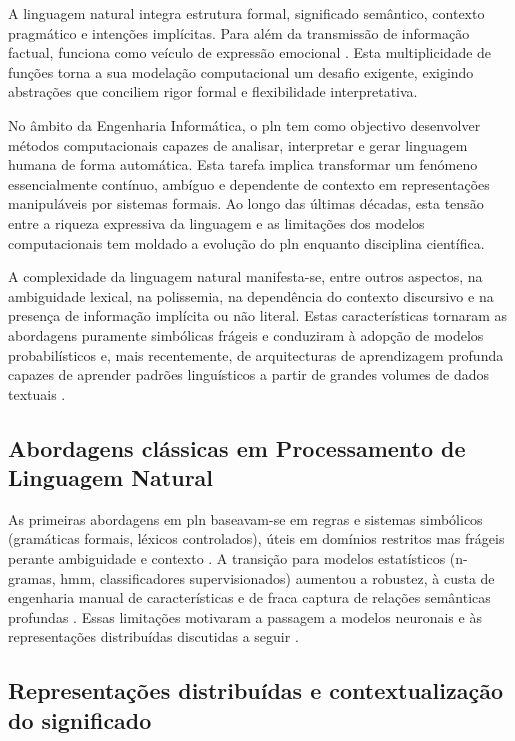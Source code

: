 A linguagem natural integra estrutura formal, significado semântico, contexto pragmático e intenções implícitas. Para além da transmissão de informação factual, funciona como veículo de expressão emocional \parencite{Wiebe2005Opinions, MohammadTurney2013Lexicon}. Esta multiplicidade de funções torna a sua modelação computacional um desafio exigente, exigindo abstrações que conciliem rigor formal e flexibilidade interpretativa.

No âmbito da Engenharia Informática, o \gls{pln} tem como objectivo desenvolver métodos computacionais capazes de analisar, interpretar e gerar linguagem humana de forma automática. Esta tarefa implica transformar um fenómeno essencialmente contínuo, ambíguo e dependente de contexto em representações manipuláveis por sistemas formais. Ao longo das últimas décadas, esta tensão entre a riqueza expressiva da linguagem e as limitações dos modelos computacionais tem moldado a evolução do \gls{pln} enquanto disciplina científica.

A complexidade da linguagem natural manifesta-se, entre outros aspectos, na ambiguidade lexical, na polissemia, na dependência do contexto discursivo e na presença de informação implícita ou não literal. Estas características tornaram as abordagens puramente simbólicas frágeis e conduziram à adopção de modelos probabilísticos e, mais recentemente, de arquitecturas de aprendizagem profunda capazes de aprender padrões linguísticos a partir de grandes volumes de dados textuais \parencite{Manning2011NLP, Young2018Trends}.

\subsection{Abordagens clássicas em Processamento de Linguagem Natural}
\label{subsec:pln_classico}

As primeiras abordagens em \gls{pln} baseavam-se em regras e sistemas simbólicos (gramáticas formais, léxicos controlados), úteis em domínios restritos mas frágeis perante ambiguidade e contexto \parencite{Manning2011NLP}. A transição para modelos estatísticos (n-gramas, \gls{hmm}, classificadores supervisionados) aumentou a robustez, à custa de engenharia manual de características e de fraca captura de relações semânticas profundas \parencite{Manning2011NLP, Young2018Trends}. Essas limitações motivaram a passagem a modelos neuronais e às representações distribuídas discutidas a seguir \parencite{Young2018Trends}.

\subsection{Representações distribuídas e contextualização do significado}
\label{subsec:representacoes}

